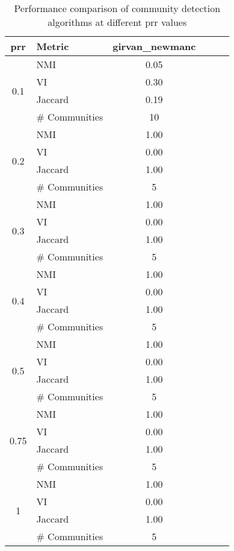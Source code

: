 \begin{table}[H]
\centering
\caption{Performance comparison of community detection algorithms at different prr values}
\begin{tabular}{|c|l|c|c|c|c|}
\hline
\textbf{prr} & \textbf{Metric} & \textbf{girvan_newmanc} \\
\hline
\multirow{4}{*}{0.1} & NMI & 0.05 \\
 & VI & 0.30 \\
 & Jaccard & 0.19 \\
 & # Communities & 10 \\
\hline
\multirow{4}{*}{0.2} & NMI & 1.00 \\
 & VI & 0.00 \\
 & Jaccard & 1.00 \\
 & # Communities & 5 \\
\hline
\multirow{4}{*}{0.3} & NMI & 1.00 \\
 & VI & 0.00 \\
 & Jaccard & 1.00 \\
 & # Communities & 5 \\
\hline
\multirow{4}{*}{0.4} & NMI & 1.00 \\
 & VI & 0.00 \\
 & Jaccard & 1.00 \\
 & # Communities & 5 \\
\hline
\multirow{4}{*}{0.5} & NMI & 1.00 \\
 & VI & 0.00 \\
 & Jaccard & 1.00 \\
 & # Communities & 5 \\
\hline
\multirow{4}{*}{0.75} & NMI & 1.00 \\
 & VI & 0.00 \\
 & Jaccard & 1.00 \\
 & # Communities & 5 \\
\hline
\multirow{4}{*}{1} & NMI & 1.00 \\
 & VI & 0.00 \\
 & Jaccard & 1.00 \\
 & # Communities & 5 \\
\hline
\end{tabular}
\label{tab:algorithm_comparison}
\end{table}
